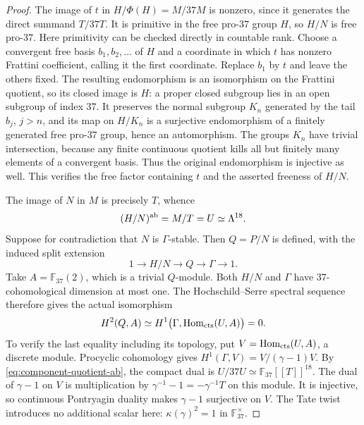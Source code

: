 \begin{proof}
The image of $t$ in $H/\Phi(H)=M/37M$ is nonzero, since it
generates the direct summand $T/37T$.  It is primitive in the free
pro-$37$ group $H$, so $H/N$ is free pro-$37$.
Here primitivity can be checked directly in countable rank.
Choose a convergent free basis $b_1,b_2,\ldots$ of $H$ and a
coordinate in which $t$ has nonzero Frattini coefficient, calling
it the first coordinate.  Replace $b_1$ by $t$ and leave the
others fixed.  The resulting endomorphism is an isomorphism on
the Frattini quotient, so its closed image is $H$: a proper
closed subgroup lies in an open subgroup of index $37$.
It preserves the normal subgroup $K_n$ generated by the tail
$b_j$, $j>n$, and its map on $H/K_n$ is a surjective
endomorphism of a finitely generated free pro-$37$ group, hence
an automorphism.  The groups $K_n$ have trivial intersection,
because any finite continuous quotient kills all but finitely
many elements of a convergent basis.  Thus the original
endomorphism is injective as well.  This verifies the free
factor containing $t$ and the asserted freeness of $H/N$.

The image of $N$ in $M$ is precisely $T$, whence
\begin{equation}\label{eq:component-quotient-ab}
 (H/N)^{\rm ab}=M/T=U\simeq\Lambda^{18}.
\end{equation}
Suppose for contradiction that $N$ is $\Gamma$-stable.  Then
$Q=P/N$ is defined, with the induced split extension
\[
 1\longrightarrow H/N\longrightarrow Q\longrightarrow\Gamma
 \longrightarrow1.
\]
Take $A=\mathbb F_{37}(2)$, which is a trivial $Q$-module.
Both $H/N$ and $\Gamma$ have $37$-cohomological dimension at
most one.  The Hochschild--Serre spectral sequence therefore
gives the actual isomorphism
\begin{equation}\label{eq:component-h2-zero}
 H^2(Q,A)\simeq
 H^1\bigl(\Gamma,\operatorname{Hom}_{\rm cts}(U,A)\bigr)=0.
\end{equation}
To verify the last equality including its topology, put
$V=\operatorname{Hom}_{\rm cts}(U,A)$, a discrete module.
Procyclic cohomology gives $H^1(\Gamma,V)=V/(\gamma-1)V$.
By \eqref{eq:component-quotient-ab}, the compact dual is
$U/37U\simeq\mathbb F_{37}[[T]]^{18}$.
The dual of $\gamma-1$ on $V$ is multiplication by
$\gamma^{-1}-1=-\gamma^{-1}T$ on this module.  It is injective,
so continuous Pontryagin duality makes $\gamma-1$ surjective
on $V$.  The Tate twist introduces no additional scalar here:
$\kappa(\gamma)^2=1$ in $\mathbb F_{37}^{\times}$.


\end{proof}
